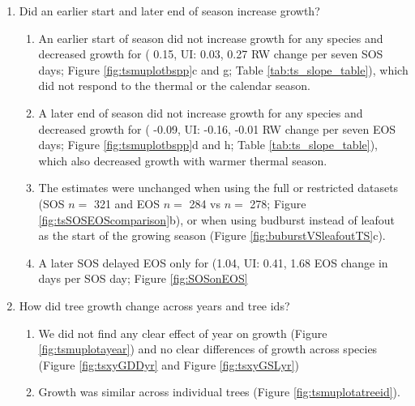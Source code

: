 \documentclass{article}\usepackage[]{graphicx}\usepackage[]{xcolor}
\begin{document}
\begin{enumerate}
\begin{enumerate}
  \end{enumerate}
  
\item Did an earlier start and later end of season increase growth? 

  \begin{enumerate}
  \item An earlier start of season did not increase growth for any species and decreased growth for {\Tame} (
  0.15, UI:
  0.03,
  0.27 RW change per seven SOS days; Figure \ref{fig:tsmuplotbspp}c and g; Table \ref{tab:ts_slope_table}), which did not respond to the thermal or the calendar season.

\item A later end of season did not increase growth for any species and decreased growth for {\Ball} (
-0.09, UI:
-0.16,
-0.01 RW change per seven EOS days; Figure \ref{fig:tsmuplotbspp}d and h; Table \ref{tab:ts_slope_table}), which also decreased growth with warmer thermal season.

\item The estimates were unchanged when using the full or restricted datasets (SOS $n =$
321 and EOS $n =$
284 vs $n=$
278; Figure \ref{fig:tsSOSEOScomparison}b), or when using budburst instead of leafout as the start of the growing season (Figure \ref{fig:buburstVSleafoutTS}c).


\item A later SOS delayed EOS only for {\Pdel} 
(1.04, UI:
0.41,
1.68 EOS change in days per SOS day; Figure \ref{fig:SOSonEOS}
\end{enumerate}

\item How did tree growth change across years and tree ids?
  \begin{enumerate}
  
  \item We did not find any clear effect of year on growth (Figure \ref{fig:tsmuplotayear}) and no clear differences of growth across species (Figure \ref{fig:tsxyGDDyr} and Figure \ref{fig:tsxyGSLyr})
  
  \item Growth was similar across individual trees (Figure \ref{fig:tsmuplotatreeid}).

  \end{enumerate}
\end{enumerate}
\end{document}
